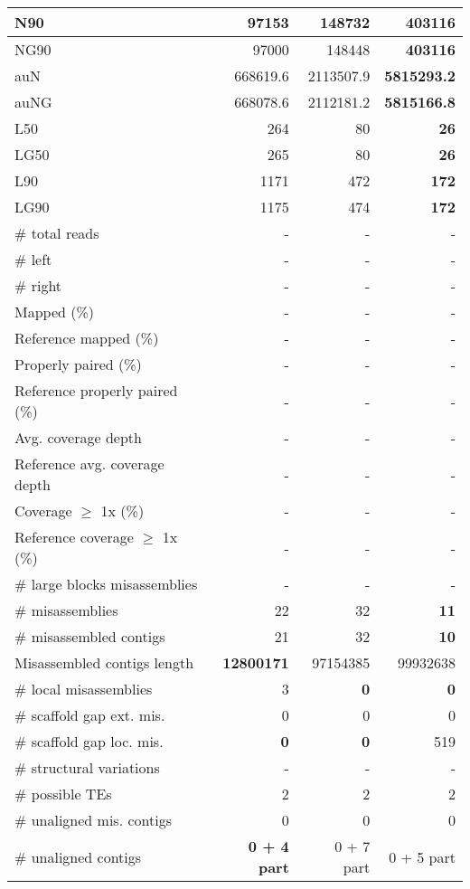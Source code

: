 \documentclass[12pt,a4paper]{article}
\begin{document}
\begin{table}[ht]
\begin{center}
\begin{tabular}{|l*{3}{|r}|}
N90 & 97153 & 148732 & {\bf 403116} \\ \hline
NG90 & 97000 & 148448 & {\bf 403116} \\ \hline
auN & 668619.6 & 2113507.9 & {\bf 5815293.2} \\ \hline
auNG & 668078.6 & 2112181.2 & {\bf 5815166.8} \\ \hline
L50 & 264 & 80 & {\bf 26} \\ \hline
LG50 & 265 & 80 & {\bf 26} \\ \hline
L90 & 1171 & 472 & {\bf 172} \\ \hline
LG90 & 1175 & 474 & {\bf 172} \\ \hline
\# total reads & - & - & - \\ \hline
\# left & - & - & - \\ \hline
\# right & - & - & - \\ \hline
Mapped (\%) & - & - & - \\ \hline
Reference mapped (\%) & - & - & - \\ \hline
Properly paired (\%) & - & - & - \\ \hline
Reference properly paired (\%) & - & - & - \\ \hline
Avg. coverage depth & - & - & - \\ \hline
Reference avg. coverage depth & - & - & - \\ \hline
Coverage $\geq$ 1x (\%) & - & - & - \\ \hline
Reference coverage $\geq$ 1x (\%) & - & - & - \\ \hline
\# large blocks misassemblies & - & - & - \\ \hline
\# misassemblies & 22 & 32 & {\bf 11} \\ \hline
\# misassembled contigs & 21 & 32 & {\bf 10} \\ \hline
Misassembled contigs length & {\bf 12800171} & 97154385 & 99932638 \\ \hline
\# local misassemblies & 3 & {\bf 0} & {\bf 0} \\ \hline
\# scaffold gap ext. mis. & 0 & 0 & 0 \\ \hline
\# scaffold gap loc. mis. & {\bf 0} & {\bf 0} & 519 \\ \hline
\# structural variations & - & - & - \\ \hline
\# possible TEs & 2 & 2 & 2 \\ \hline
\# unaligned mis. contigs & 0 & 0 & 0 \\ \hline
\# unaligned contigs & {\bf 0 + 4 part} & 0 + 7 part & 0 + 5 part \\ \hline

\end{tabular}
\end{center}
\end{table}
\end{document}
